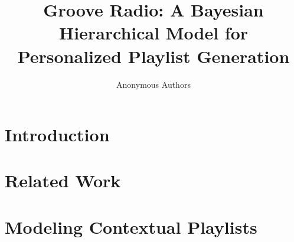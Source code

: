 \documentclass{sig-alternate}
\title{Groove Radio: A Bayesian Hierarchical Model for Personalized Playlist Generation}
\begin{document}


\author{
	\alignauthor
	Anonymous Authors\\
	\alignauthor
}



\maketitle

\vspace{-4mm}
\begin{abstract}
	
\end{abstract}
\vspace{-2mm}     
\section{Introduction}
\label{sec:Introduction}
   
\vspace{-2mm}
\section{Related Work}
\label{sec:Related}
    
\vspace{-2mm}    
\section{Modeling Contextual Playlists}
\label{sec:ourapproach}
    
\vspace{-2mm}    
\end{document}

